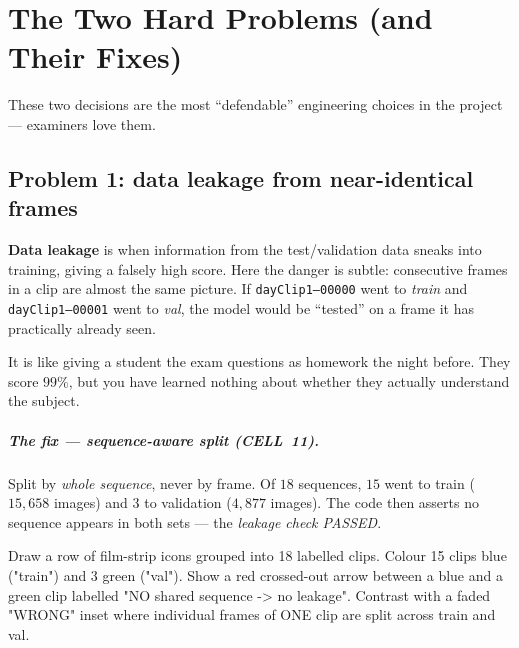 \chapter{The Two Hard Problems (and Their Fixes)}
\label{ch:hardproblems}
These two decisions are the most ``defendable'' engineering choices in
the project --- examiners love them.

\section{Problem 1: data leakage from near-identical frames}
\begin{keyconcept}
\textbf{Data leakage} is when information from the test/validation data
sneaks into training, giving a falsely high score. Here the danger is
subtle: consecutive frames in a clip are almost the same picture. If
\texttt{dayClip1--00000} went to \emph{train} and
\texttt{dayClip1--00001} went to \emph{val}, the model would be
``tested'' on a frame it has practically already seen.
\end{keyconcept}

\begin{analogy}
It is like giving a student the exam questions as homework the night
before. They score $99\%$, but you have learned nothing about whether
they actually understand the subject.
\end{analogy}

\paragraph{The fix --- sequence-aware split (CELL~11).} Split by
\emph{whole sequence}, never by frame. Of $18$ sequences, $15$ went to
train ($15{,}658$ images) and $3$ to validation ($4{,}877$ images). The
code then asserts no sequence appears in both sets --- the
\emph{leakage check PASSED}.

\begin{diagramprompt}
Draw a row of film-strip icons grouped into 18 labelled clips. Colour 15
clips blue ("train") and 3 green ("val"). Show a red crossed-out arrow
between a blue and a green clip labelled "NO shared sequence -> no
leakage". Contrast with a faded "WRONG" inset where individual frames of
ONE clip are split across train and val.
\end{diagramprompt}

